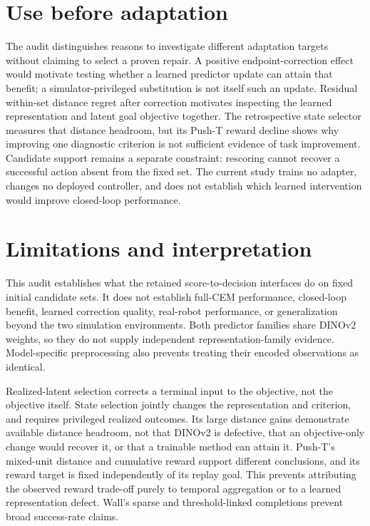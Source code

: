 \documentclass{article}
\begin{document}
\section{Use before adaptation}

The audit distinguishes reasons to investigate different adaptation targets
without claiming to select a proven repair. A positive endpoint-correction
effect would motivate testing whether a learned predictor update can attain
that benefit; a simulator-privileged substitution is not itself such an update.
Residual within-set distance regret after correction motivates inspecting the
learned representation and latent goal objective together. The retrospective
state selector measures that distance headroom, but its Push-T reward decline
shows why improving one diagnostic criterion is not sufficient evidence of
task improvement. Candidate support remains a separate constraint: rescoring
cannot recover a successful action absent from the fixed set. The current
study trains no adapter, changes no deployed controller, and does not establish
which learned intervention would improve closed-loop performance.

\section{Limitations and interpretation}

This audit establishes what the retained score-to-decision interfaces do on
fixed initial candidate sets. It does not establish full-CEM performance,
closed-loop benefit, learned correction quality, real-robot performance, or
generalization beyond the two simulation environments. Both predictor families
share DINOv2 weights, so they do not supply independent representation-family
evidence. Model-specific preprocessing also prevents treating their encoded
observations as identical.

Realized-latent selection corrects a terminal input to the objective, not the
objective itself. State selection jointly changes the representation and
criterion, and requires privileged realized outcomes. Its large distance gains
demonstrate available distance headroom, not that DINOv2 is defective, that an
objective-only change would recover it, or that a trainable method can attain
it. Push-T's mixed-unit distance and cumulative reward support different
conclusions, and its reward target is fixed independently of its replay goal. This prevents
attributing the observed reward trade-off purely to temporal aggregation or
to a learned representation defect. Wall's sparse and threshold-linked
completions prevent broad
success-rate claims.
\end{document}
